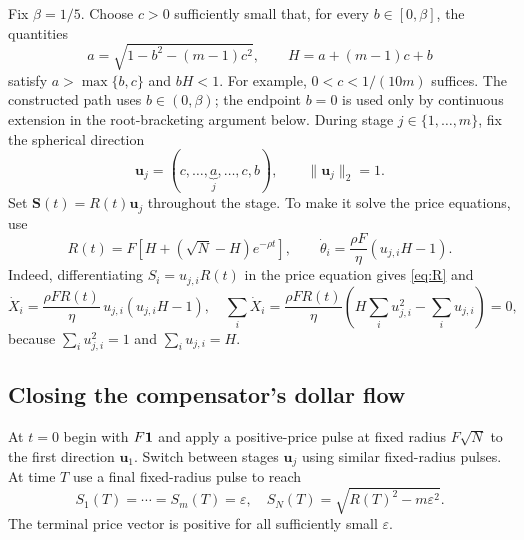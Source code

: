 \documentclass[review,hidelinks,onefignum,onetabnum]{siamonline250211}
\begin{document}
Fix $\beta=1/5$. Choose $c>0$ sufficiently small that, for every $b\in[0,\beta]$, the quantities
\begin{equation}\label{eq:abcs}
a=\sqrt{1-b^2-(m-1)c^2},\qquad H=a+(m-1)c+b
\end{equation}
satisfy $a>\max\{b,c\}$ and $bH<1$. For example, $0<c<1/(10m)$ suffices. The constructed path uses $b\in(0,\beta)$; the endpoint $b=0$ is used only by continuous extension in the root-bracketing argument below. During stage $j\in\{1,\dots,m\}$, fix the spherical direction
\begin{equation}\label{eq:uj}
\bm u_j=(c,\ldots,\underbrace{a}_{j},\ldots,c,b),
\qquad \|\bm u_j\|_2=1.
\end{equation}
Set $\bm S(t)=R(t)\bm u_j$ throughout the stage. To make it solve the price equations, use
\begin{equation}\label{eq:R}
R(t)=F\left[H+(\sqrt N-H)e^{-\rho t}\right],
\qquad
\dot\theta_i=\frac{\rho F}{\eta}\left(u_{j,i}H-1\right).
\end{equation}
Indeed, differentiating $S_i=u_{j,i}R(t)$ in the price equation gives \eqref{eq:R} and
\begin{equation}\label{eq:dXdt}
\dot X_i=\frac{\rho FR(t)}\eta\,u_{j,i}(u_{j,i}H-1),
\quad \sum_i\dot X_i=\frac{\rho FR(t)}\eta\left(H\sum_i u_{j,i}^2-\sum_i u_{j,i}\right)=0,
\end{equation}
because $\sum_i u_{j,i}^2=1$ and $\sum_i u_{j,i}=H$.

\subsection{Closing the compensator's dollar flow}
At $t=0$ begin with $F\mathbf{1}$ and apply a positive-price pulse at fixed radius $F\sqrt N$ to the first direction $\bm u_1$. Switch between stages $\bm u_j$ using similar fixed-radius pulses. At time $T$ use a final fixed-radius pulse to reach
\begin{equation}\label{eq:endpoint-severe}
S_1(T)=\cdots=S_m(T)=\varepsilon,
\quad S_N(T)=\sqrt{R(T)^2-m\varepsilon^2}.
\end{equation}
The terminal price vector is positive for all sufficiently small $\varepsilon$.
\end{document}
